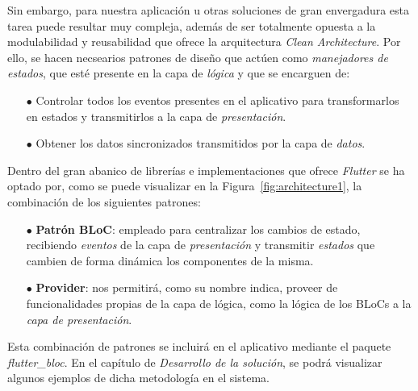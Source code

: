 Sin embargo, para nuestra aplicación u otras soluciones de gran envergadura esta tarea puede resultar muy compleja,
además de ser totalmente opuesta a la modulabilidad y reusabilidad que ofrece la arquitectura \textit{Clean Architecture}.
Por ello, se hacen necsearios patrones de diseño que actúen como
\textit{manejadores de estados}, que esté presente en la capa de \textit{lógica} y que se encarguen de:

\begin{itemize}
  \item[$\bullet$] Controlar todos los eventos presentes en el aplicativo 
  para transformarlos en estados y transmitirlos a la capa de \textit{presentación}.
  \item[$\bullet$] Obtener los datos sincronizados transmitidos por la capa de \textit{datos}.
\end{itemize}

Dentro del gran abanico de librerías e implementaciones que ofrece \textit{Flutter} se ha optado por, como se puede 
visualizar en la Figura~\ref{fig:architecture1}, la combinación de los siguientes patrones:

\begin{itemize}
  \item[$\bullet$] \textbf{Patrón BLoC}: empleado para centralizar los cambios de estado, recibiendo \textit{eventos}
   de la capa de \textit{presentación} y transmitir \textit{estados} que cambien de forma dinámica los componentes de
    la misma.
  \item[$\bullet$] \textbf{Provider}: nos permitirá, como su nombre indica, proveer de funcionalidades propias
  de la capa de lógica, como la lógica de los BLoCs a la \textit{capa de presentación}.
\end{itemize}

Esta combinación de patrones se incluirá en el aplicativo mediante el paquete \textit{flutter\_bloc}.
En el capítulo de \textit{Desarrollo de la solución}, se podrá visualizar algunos ejemplos de dicha metodología en
el sistema.
